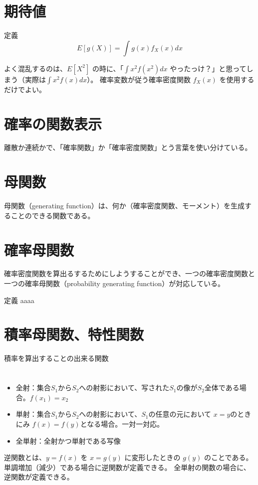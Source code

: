 \documentclass[10pt,a4paper,uplatex]{jsarticle}
\begin{document}

\section{期待値}


\begin{itembox}[l]{定義}
  \begin{equation}
    E[g(X)] = \int g(x)f_X(x) dx
  \end{equation}
\end{itembox}

よく混乱するのは、$E[X^2]$ の時に、「$\int x^2f(x^2) dx$ やったっけ？」と思ってしまう（実際は$\int x^2f(x) dx$）。
確率変数が従う確率密度関数 $f_X(x)$ を使用するだけでよい。

\section{確率の関数表示}

離散か連続かで、「確率関数」か「確率密度関数」とう言葉を使い分けている。

\section{母関数}

母関数（generating function）は、何か（確率密度関数、モーメント）を生成することのできる関数である。


\section{確率母関数}

確率密度関数を算出るするためにしようすることができ、一つの確率密度関数と一つの確率母関数（probability generating function）が対応している。

\begin{itembox}[l]{定義}
aaaa
\end{itembox}

\section{積率母関数、特性関数}

積率を算出することの出来る関数

\section{}

\begin{itemize}
  \item 全射：集合$S_1$から$S_2$への射影において、写された$S_1$の像が$S_2$全体である場合。$f(x_1)=x_2$
  \item 単射：集合$S_1$から$S_2$への射影において、$S_1$の任意の元において $x=y$のときにみ $f(x)=f(y)$となる場合。一対一対応。
  \item 全単射：全射かつ単射である写像
\end{itemize}

逆関数とは、$y=f(x)$ を $x=g(y)$ に変形したときの $g(y)$ のことである。
単調増加（減少）である場合に逆関数が定義できる。
全単射の関数の場合に、逆関数が定義できる。
\end{document}
